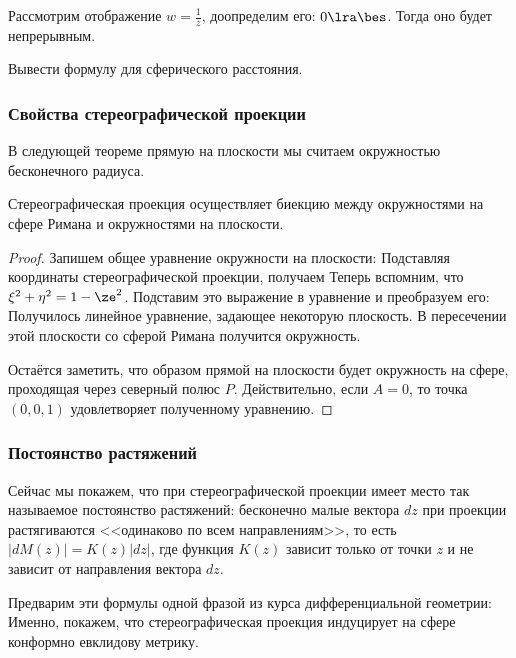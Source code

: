 \documentclass[a4paper]{article}
\begin{document}
\begin{ex}
Рассмотрим отображение $w = \frac{1}{z}$, доопределим его: $0 \lra \bes$. Тогда оно будет непрерывным.
\end{ex}

\begin{problem}
Вывести формулу для сферического расстояния.
\end{problem}

\subsubsection{Свойства стереографической проекции}

В следующей теореме прямую на плоскости мы считаем окружностью бесконечного радиуса.

\begin{theorem}
Стереографическая проекция осуществляет биекцию между окружностями на сфере Римана и окружностями на плоскости.
\end{theorem}
\begin{proof}
Запишем общее уравнение окружности на плоскости:
Подставляя координаты стереографической проекции, получаем
Теперь вспомним, что $\xi^2+\eta^2 = 1-\ze^2$. Подставим это выражение в уравнение и преобразуем его:
Получилось линейное уравнение, задающее некоторую плоскость. В пересечении этой плоскости со сферой
Римана получится окружность.

Остаётся заметить, что образом прямой на плоскости будет окружность на сфере, проходящая через северный полюс $P$.
Действительно, если $A=0$, то точка $(0,0,1)$ удовлетворяет полученному уравнению.
\end{proof}

\subsubsection{Постоянство растяжений}

Сейчас мы покажем, что при стереографической проекции имеет место так называемое постоянство растяжений:
бесконечно малые вектора $dz$ при проекции растягиваются <<одинаково по всем направлениям>>, то есть
$|dM(z)| = K(z)|dz|$, где функция $K(z)$ зависит только от точки $z$ и не зависит от направления вектора $dz$.

\begin{petit}
Предварим эти формулы одной фразой из курса дифференциальной геометрии: Именно, покажем, что стереографическая проекция
индуцирует на сфере конформно евклидову метрику.
\end{petit}
\end{document}
